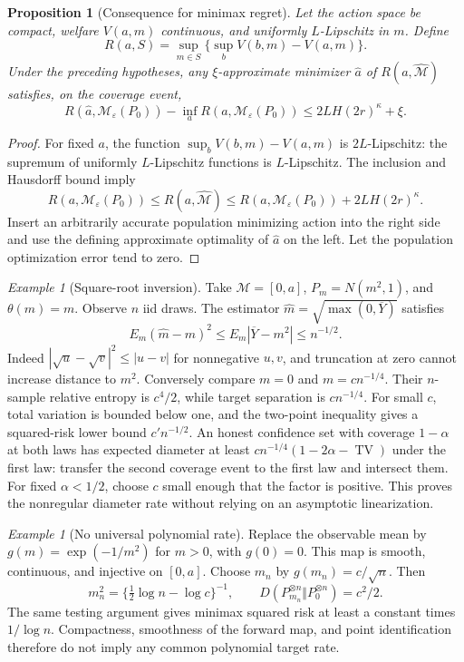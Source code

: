 \documentclass[11pt]{article}
\newtheorem{proposition}[theorem]{Proposition}
\theoremstyle{remark}
\newtheorem{example}[theorem]{Example}
\begin{document}
\begin{proposition}[Consequence for minimax regret]
Let the action space be compact, welfare $V(a,m)$ continuous, and uniformly $L$-Lipschitz in $m$. Define
\[
 R(a,S)=\sup_{m\in S}\{\sup_bV(b,m)-V(a,m)\}.
\]
Under the preceding hypotheses, any $\xi$-approximate minimizer $\widehat a$ of $R(a,\widehat{\mathcal M})$ satisfies, on the coverage event,
\[
 R(\widehat a,\mathcal M_\varepsilon(P_0))
 -\inf_aR(a,\mathcal M_\varepsilon(P_0))
 \le2LH(2r)^\kappa+\xi.
\]
\end{proposition}
\begin{proof}
For fixed $a$, the function $\sup_bV(b,m)-V(a,m)$ is $2L$-Lipschitz: the supremum of uniformly $L$-Lipschitz functions is $L$-Lipschitz. The inclusion and Hausdorff bound imply
\[
 R(a,\mathcal M_\varepsilon(P_0))\le R(a,\widehat{\mathcal M})
 \le R(a,\mathcal M_\varepsilon(P_0))+2LH(2r)^\kappa.
\]
Insert an arbitrarily accurate population minimizing action into the right side and use the defining approximate optimality of $\widehat a$ on the left. Let the population optimization error tend to zero.
\end{proof}

\begin{example}[Square-root inversion]
Take $\mathcal M=[0,a]$, $P_m=N(m^2,1)$, and $\theta(m)=m$. Observe $n$ iid draws. The estimator $\widehat m=\sqrt{\max(0,\overline Y)}$ satisfies
\[
 E_m(\widehat m-m)^2\le E_m|\overline Y-m^2|\le n^{-1/2}.
\]
Indeed $|\sqrt u-\sqrt v|^2\le|u-v|$ for nonnegative $u,v$, and truncation at zero cannot increase distance to $m^2$. Conversely compare $m=0$ and $m=c n^{-1/4}$. Their $n$-sample relative entropy is $c^4/2$, while target separation is $c n^{-1/4}$. For small $c$, total variation is bounded below one, and the two-point inequality gives a squared-risk lower bound $c' n^{-1/2}$. An honest confidence set with coverage $1-\alpha$ at both laws has expected diameter at least $c n^{-1/4}(1-2\alpha-\operatorname{TV})$ under the first law: transfer the second coverage event to the first law and intersect them. For fixed $\alpha<1/2$, choose $c$ small enough that the factor is positive. This proves the nonregular diameter rate without relying on an asymptotic linearization.
\end{example}

\begin{example}[No universal polynomial rate]
Replace the observable mean by $g(m)=\exp(-1/m^2)$ for $m>0$, with $g(0)=0$. This map is smooth, continuous, and injective on $[0,a]$. Choose $m_n$ by $g(m_n)=c/\sqrt n$. Then
\[
 m_n^2=\{\tfrac12\log n-\log c\}^{-1},\qquad
 D(P_{m_n}^{\otimes n}\Vert P_0^{\otimes n})=c^2/2.
\]
The same testing argument gives minimax squared risk at least a constant times $1/\log n$. Compactness, smoothness of the forward map, and point identification therefore do not imply any common polynomial target rate.
\end{example}
\end{document}
